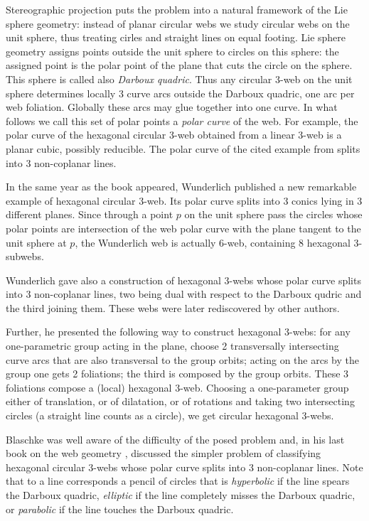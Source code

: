 \documentclass[11pt,a4paper]{article}
\begin{document}
Stereographic projection puts the problem into a natural framework of the Lie sphere geometry: instead of planar circular webs we study circular webs on the unit sphere, thus treating cirles and straight lines on equal footing.   Lie sphere geometry assigns points outside the unit sphere  to circles on this sphere: the assigned point is the polar point of the plane that cuts the circle on the sphere. This sphere is  called also {\it Darboux quadric}. Thus any circular 3-web on the unit sphere determines locally  3 curve arcs outside the Darboux quadric, one arc  per web foliation. Globally these arcs may glue together into one curve.   In what follows we call this set of polar points  a {\it polar curve} of the web. For example, the polar curve of the hexagonal circular 3-web obtained from a linear 3-web is a planar cubic, possibly reducible.    The polar curve of the cited example from \cite{BB-38} splits into 3 non-coplanar lines.

In the same year as the book \cite{BB-38} appeared, Wunderlich published a new remarkable example of hexagonal circular 3-web. Its polar curve splits into 3 conics lying in 3 different planes. Since through a point $p$ on the unit sphere pass the circles whose polar points are intersection of the web polar curve with the plane tangent to the unit sphere at $p$, the Wunderlich web is actually 6-web, containing 8 hexagonal 3-subwebs. 

Wunderlich gave also a construction of hexagonal  3-webs whose polar curve splits into 3 non-coplanar lines, two being dual with respect to the Darboux qudric and the third joining them.  These webs were later rediscovered by other authors. 

Further, he  presented the following way to  construct hexagonal 3-webs:  for any one-parametric group acting in the plane,  choose 2 transversally intersecting curve arcs that are also transversal to the group orbits; acting on the arcs by the group one gets 2 foliations; the third is composed by the group orbits. These 3 foliations compose a (local) hexagonal 3-web. Choosing a one-parameter group  either of translation, or of dilatation,  or of rotations and taking two intersecting circles (a straight line counts  as a circle), we get circular hexagonal 3-webs.

Blaschke was well aware of the difficulty of the posed problem and, in his last book on the web geometry \cite{B-55}, discussed the simpler problem of classifying hexagonal circular 3-webs whose polar curve splits into 3 non-coplanar lines. Note that to a line corresponds a pencil of circles that is {\it hyperbolic} if the line spears the Darboux quadric,  {\it elliptic} if the line completely misses the Darboux quadric, or {\it parabolic} if the line touches the Darboux quadric. 
\end{document}
